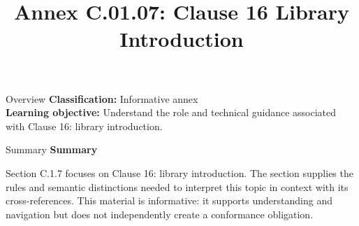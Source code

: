 \documentclass[10pt,letterpaper]{article}
\title{Annex C.01.07: Clause 16 Library Introduction}
\author{}
\date{}
\begin{document}
\maketitle
\begin{CornellOverviewBox}{Overview}
\textbf{Classification:} Informative annex\\[2pt]
\textbf{Learning objective:} Understand the role and technical guidance associated with Clause 16: library introduction.
\end{CornellOverviewBox}\begin{CornellSummaryBox}{Summary}
{\sffamily\bfseries\color{Accent} Summary}\par\vspace{3pt}Section C.1.7 focuses on Clause 16: library introduction. The section supplies the rules and semantic distinctions needed to interpret this topic in context with its cross-references. This material is informative: it supports understanding and navigation but does not independently create a conformance obligation.
\end{CornellSummaryBox}
\end{document}
